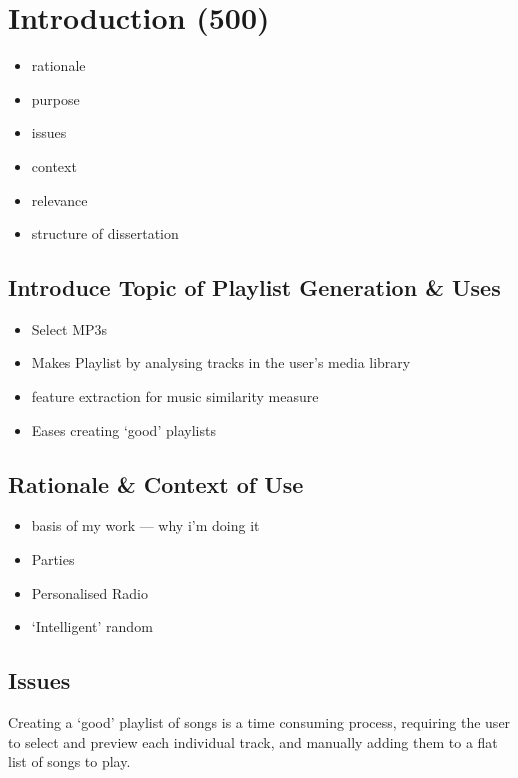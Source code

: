 \chapter{Introduction (500)}
\begin{itemize}
	\item rationale
	\item purpose
	\item issues
	\item context
	\item relevance
	\item structure of dissertation
\end{itemize}
\section{Introduce Topic of Playlist Generation \& Uses}
\begin{itemize}
	\item Select MP3s
	\item Makes Playlist by analysing tracks in the user's media library
	\item feature extraction for music similarity measure
	\item Eases creating `good' playlists
\end{itemize}
\section{Rationale \& Context of Use}
\begin{itemize}
	\item basis of my work --- why i'm doing it
	\item Parties
	\item Personalised Radio
	\item `Intelligent' random
\end{itemize}
\section{Issues}
Creating a `good' playlist of songs is a time consuming process, requiring the user to select and preview each individual track, and manually adding them to a flat list of songs to play.
